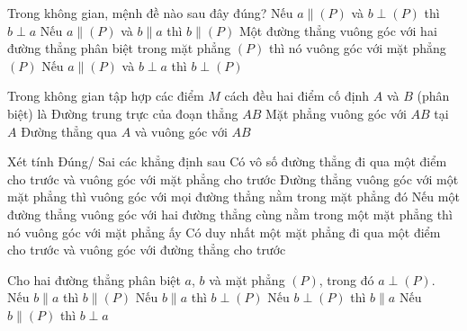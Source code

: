 \begin{ex}%
	Trong không gian, mệnh đề nào sau  đây đúng?
	 \choice
		{\True Nếu $a\parallel (P)$ và $b\perp (P)$  thì $b\perp a$}
		{Nếu $a\parallel (P)$ và $b\parallel a$ thì $b\parallel  (P)$}
		{Một đường thẳng  vuông góc với hai đường thẳng phân biệt trong mặt phẳng $(P)$ thì nó vuông góc với mặt phẳng $(P)$}
		{Nếu $a\parallel (P)$ và $b\perp a$ thì $b\perp (P)$} 
\end{ex}

\begin{ex}%
	 Trong không gian tập hợp các điểm $M$ cách đều hai điểm cố định $A$ và $B$ (phân biệt) là
		{Đường  trung trực của đoạn thẳng $AB$}
		{Mặt  phẳng vuông góc với $AB$ tại $A$}
		{Đường thẳng qua  $A$ và vuông góc với $AB$}
\end{ex}



\begin{ex}%
 Xét tính Đúng/ Sai các khẳng  định sau
 \choiceTF 
  {Có vô số đường thẳng đi qua một điểm cho trước  và vuông góc với mặt phẳng cho trước}
  {\True Đường thẳng vuông góc với một mặt phẳng thì vuông góc với mọi đường thẳng nằm trong mặt  phẳng đó}
  {Nếu một đường thẳng vuông góc với hai đường thẳng cùng nằm  trong một mặt phẳng thì nó vuông góc với mặt phẳng ấy}
  {\True Có duy nhất một mặt phẳng  đi qua một điểm cho trước và vuông góc với đường thẳng cho trước}
\end{ex}

\begin{ex}%
 Cho hai  đường thẳng phân biệt $a$, $b$ và mặt phẳng $(P)$, trong đó $a\perp(P)$.
 \choiceTF 
  {Nếu $b\parallel a$ thì $b\parallel(P)$} 
  {\True Nếu $b\parallel  a$ thì $b\perp(P)$}
  {Nếu $b\perp(P)$ thì $b\parallel  a$}
  {Nếu $b\parallel(P)$ thì $b\perp  a$}
\end{ex}

